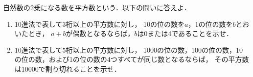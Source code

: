\documentclass[../../main.tex]{subfiles}
\begin{document}
自然数の2乗になる数を平方数という．以下の問いに答えよ．
\begin{enumerate}
  \item 10進法で表して3桁以上の平方数に対し，
    10の位の数を$a$，1の位の数を$b$とおいたとき，
    $a+b$が偶数となるならば，$b$は0または4であることを示せ．
  \item 10進法で表して5桁以上の平方数に対し，
    1000の位の数，100の位の数，10の位の数，および1の位の数の4つすべてが同じ数となるならば，
    その平方数は10000で割り切れることを示せ．
\end{enumerate}
\end{document}
